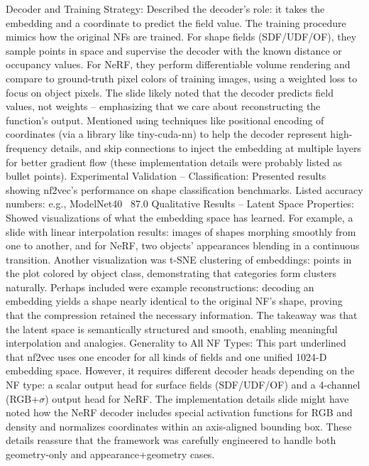 \documentclass[11pt]{article}
\begin{document}
Decoder and Training Strategy: Described the decoder’s role: it takes the embedding and a coordinate to predict the field value. The training procedure mimics how the original NFs are trained. For shape fields (SDF/UDF/OF), they sample points in space and supervise the decoder with the known distance or occupancy values. For NeRF, they perform differentiable volume rendering and compare to ground-truth pixel colors of training images, using a weighted loss to focus on object pixels. The slide likely noted that the decoder predicts field values, not weights – emphasizing that we care about reconstructing the function’s output. Mentioned using techniques like positional encoding of coordinates (via a library like tiny-cuda-nn) to help the decoder represent high-frequency details, and skip connections to inject the embedding at multiple layers for better gradient flow (these implementation details were probably listed as bullet points).
Experimental Validation – Classification: Presented results showing nf2vec’s performance on shape classification benchmarks. Listed accuracy numbers: e.g., ModelNet40 ~87.0%
Qualitative Results – Latent Space Properties: Showed visualizations of what the embedding space has learned. For example, a slide with linear interpolation results: images of shapes morphing smoothly from one to another, and for NeRF, two objects’ appearances blending in a continuous transition. Another visualization was t-SNE clustering of embeddings: points in the plot colored by object class, demonstrating that categories form clusters naturally. Perhaps included were example reconstructions: decoding an embedding yields a shape nearly identical to the original NF’s shape, proving that the compression retained the necessary information. The takeaway was that the latent space is semantically structured and smooth, enabling meaningful interpolation and analogies.
Generality to All NF Types: This part underlined that nf2vec uses one encoder for all kinds of fields and one unified 1024-D embedding space. However, it requires different decoder heads depending on the NF type: a scalar output head for surface fields (SDF/UDF/OF) and a 4-channel (RGB+$\sigma$) output head for NeRF. The implementation details slide might have noted how the NeRF decoder includes special activation functions for RGB and density and normalizes coordinates within an axis-aligned bounding box. These details reassure that the framework was carefully engineered to handle both geometry-only and appearance+geometry cases.
\end{document}
